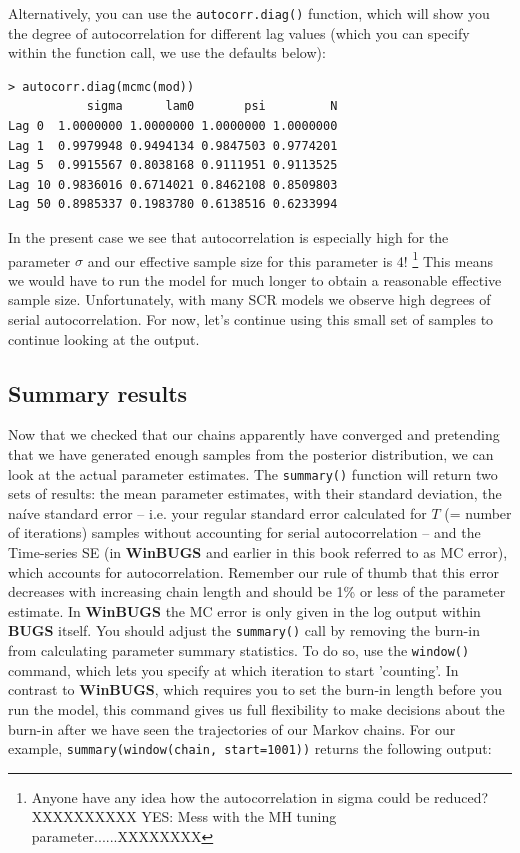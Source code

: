 Alternatively, you can use the \verb#autocorr.diag()# function, which will show you the degree of autocorrelation for different lag values (which you can specify within the function call, we use the defaults below):
\begin{verbatim}
> autocorr.diag(mcmc(mod))
           sigma      lam0       psi         N
Lag 0  1.0000000 1.0000000 1.0000000 1.0000000
Lag 1  0.9979948 0.9494134 0.9847503 0.9774201
Lag 5  0.9915567 0.8038168 0.9111951 0.9113525
Lag 10 0.9836016 0.6714021 0.8462108 0.8509803
Lag 50 0.8985337 0.1983780 0.6138516 0.6233994
\end{verbatim}
In the present case we see that autocorrelation is especially high for the 
parameter $\sigma$ and our effective sample size for this parameter is 
4! \footnote{Anyone have any idea how the autocorrelation in sigma could 
be reduced? XXXXXXXXXX YES: Mess with the MH tuning parameter......XXXXXXXX} 
This means we would have to run the model for much longer to 
obtain a reasonable effective sample size. Unfortunately, with many SCR models we observe high degrees of serial autocorrelation. For now, let's continue using this small set of samples to continue looking at the output.


\subsection{Summary results}
\label{mcmc.sec.mcmcsummary}

Now that we checked that our chains apparently have converged and pretending 
that we have generated enough samples from the posterior distribution, we 
can look at the actual parameter estimates. The \verb#summary()# function 
will return two sets of results: the mean parameter estimates, with their standard deviation, the na\'{i}ve standard error -- i.e. your regular standard error calculated for $T$ (= number of iterations) 
samples without 
accounting for serial autocorrelation -- and the 
Time-series SE (in {\bf WinBUGS} 
and earlier in this book referred to as MC error), which accounts for 
autocorrelation. Remember our rule of thumb that this error 
decreases with increasing chain length and should be 1\% or less of the 
parameter estimate. In {\bf WinBUGS} the MC error is only given in the log 
output within {\bf BUGS} itself.
You should adjust the \verb#summary()# call by removing the burn-in from
calculating parameter summary statistics. To do so, use the \verb#window()#
command, which lets you specify at which iteration to start
'counting'. In contrast to {\bf WinBUGS}, which requires you to set the
burn-in length before you run the model, this command gives us full
flexibility to make decisions about the burn-in after we have seen the
trajectories of our Markov chains. For our example,
\verb#summary(window(chain, start=1001))# returns the following output:


